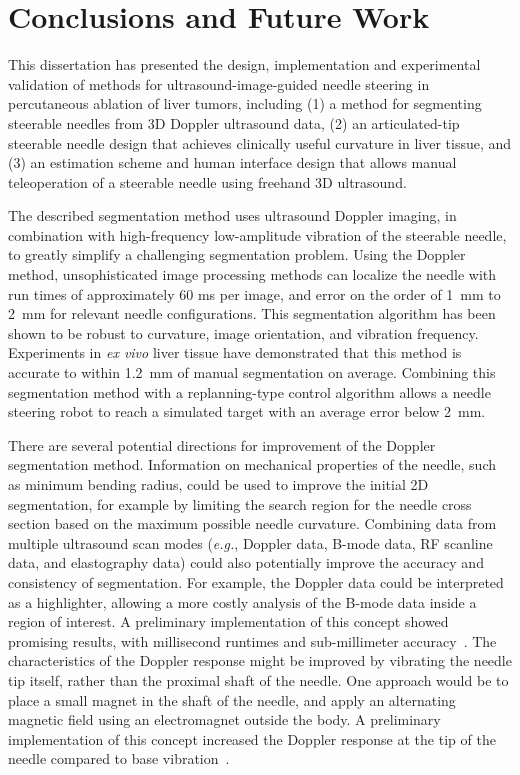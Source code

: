 \chapter[Conclusions and Future Work]{Conclusions and Future Work}
This dissertation has presented the design, implementation and experimental validation of methods for ultrasound-image-guided needle steering in percutaneous ablation of liver tumors, including (1) a method for segmenting steerable needles from 3D Doppler ultrasound data, (2) an articulated-tip steerable needle design that achieves clinically useful curvature in liver tissue, and (3) an estimation scheme and human interface design that allows manual teleoperation of a steerable needle using freehand 3D ultrasound. 

The described segmentation method uses ultrasound Doppler imaging, in combination with high-frequency low-amplitude vibration of the steerable needle, to greatly simplify a challenging segmentation problem. Using the Doppler method, unsophisticated image processing methods can localize the needle with run times of approximately 60 ms per image, and error on the order of 1~mm to 2~mm for relevant needle configurations. This segmentation algorithm has been shown to be robust to curvature, image orientation, and vibration frequency. Experiments in \textit{ex vivo} liver tissue have demonstrated that this method is accurate to within 1.2~mm of manual segmentation on average. Combining this segmentation method with a replanning-type control algorithm allows a needle steering robot to reach a simulated target with an average error below 2~mm. 

There are several potential directions for improvement of the Doppler segmentation method. Information on mechanical properties of the needle, such as minimum bending radius, could be used to improve the initial 2D segmentation, for example by limiting the search region for the needle cross section based on the maximum possible needle curvature. Combining data from multiple ultrasound scan modes (\textit{e.g.}, Doppler data, B-mode data, RF scanline data, and elastography data) could also potentially improve the accuracy and consistency of segmentation. For example, the Doppler data could be interpreted as a highlighter, allowing a more costly analysis of the B-mode data inside a region of interest. A preliminary implementation of this concept showed promising results, with millisecond runtimes and sub-millimeter accuracy~\cite{Greer2014}. The characteristics of the Doppler response might be improved by vibrating the needle tip itself, rather than the proximal shaft of the needle. One approach would be to place a small magnet in the shaft of the needle, and apply an alternating magnetic field using an electromagnet outside the body. A preliminary implementation of this concept increased the Doppler response at the tip of the needle compared to base vibration~\cite{Cabreros2014}.

